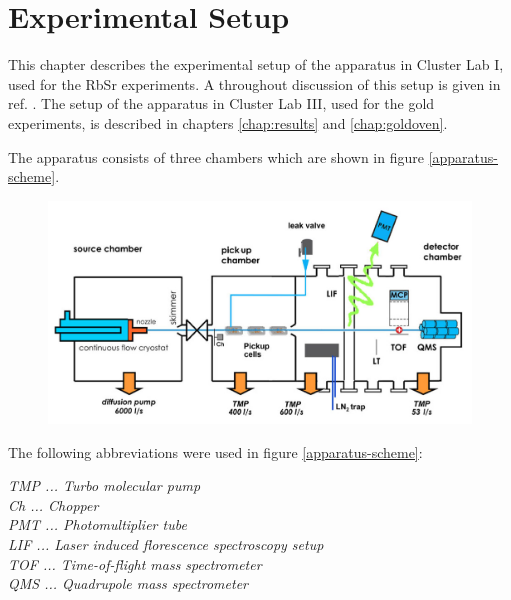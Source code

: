 \documentclass[parskip,12pt,headsepline,a4paper] {scrbook}
\begin{document}
\chapter{Experimental Setup}
\label{chap:expsetup}
This chapter describes the experimental setup of the apparatus in Cluster Lab I, used for the RbSr experiments. A throughout discussion of this setup is given in ref. \cite{nagl}. The setup of the apparatus in Cluster Lab III, used for the gold experiments, is described in chapters \ref{chap:results} and \ref{chap:goldoven}.

The apparatus consists of three chambers which are shown in figure \ref{apparatus-scheme}.



\begin{figure}[ht]
\centerline{
\includegraphics[width=13cm]{./experimental_setup/scheme.jpg}}
\end{figure}

The following abbreviations were used in figure \ref{apparatus-scheme}:

\textit{TMP ... Turbo molecular pump} \\
\textit{Ch  ... Chopper} \\
\textit{PMT ... Photomultiplier tube} \\
\textit{LIF ... Laser induced florescence spectroscopy setup} \\
\textit{TOF ... Time-of-flight mass spectrometer} \\
\textit{QMS ... Quadrupole mass spectrometer}
\end{document}
